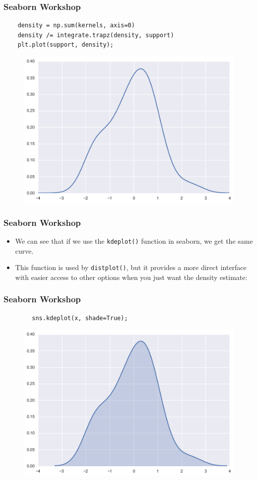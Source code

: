 \documentclass{beamer}
\begin{document}
\begin{frame}[fragile]
	\frametitle{Seaborn Workshop}
	\large
	\begin{verbatim}
	density = np.sum(kernels, axis=0)
	density /= integrate.trapz(density, support)
	plt.plot(support, density);
	\end{verbatim}
	
	\begin{figure}
		\centering
		\includegraphics[width=0.7\linewidth]{images/distributions_18_0}
	\end{figure}
\end{frame}
\begin{frame}[fragile]
	
	\frametitle{Seaborn Workshop}
	\large
	\begin{itemize}
		\item We can see that if we use the \texttt{kdeplot()} function in seaborn, we get the same curve. 
		\item This function is used by \texttt{distplot()}, but it provides a more direct interface with easier access to other options when you just want the density estimate:
	\end{itemize}
	
	
\end{frame}
\begin{frame}[fragile]
	\frametitle{Seaborn Workshop}
	\large
	\begin{framed}
		\begin{verbatim}
		sns.kdeplot(x, shade=True);
		\end{verbatim}
	\end{framed}
	
	\begin{figure}
		\centering
		\includegraphics[width=0.7\linewidth]{images/distributions_20_0}
	\end{figure}
	
\end{frame}
\end{document}
